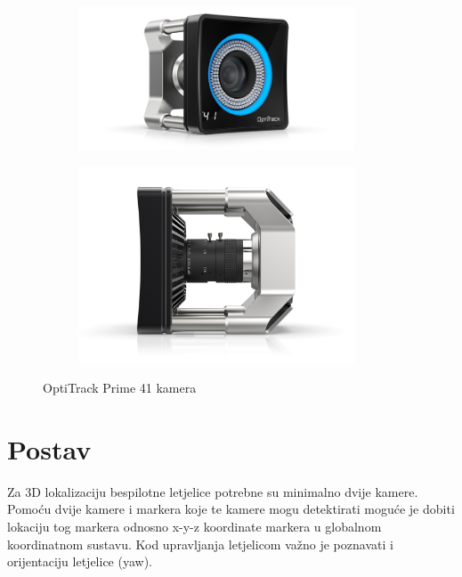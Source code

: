 \documentclass[times, utf8, diplomski]{fer}
\begin{document}
\begin{figure}[h]
\begin{subfigure}[b]{.5\textwidth}
\centering
\includegraphics[width=0.9\textwidth]{prime41}
\caption*{}
\end{subfigure}
\begin{subfigure}[b]{.5\textwidth}
\centering
\includegraphics[width=0.9\textwidth]{prime41-side}
\caption*{}
\end{subfigure}
\caption{OptiTrack Prime 41 kamera \protect\footnotemark[1]}
\end{figure}


\chapter{Postav}
Za 3D lokalizaciju bespilotne letjelice potrebne su minimalno dvije kamere. Pomoću dvije kamere i markera koje te kamere mogu detektirati moguće je dobiti lokaciju tog markera odnosno x-y-z koordinate markera u globalnom koordinatnom sustavu. Kod upravljanja letjelicom važno je poznavati i orijentaciju letjelice (yaw). 
\end{document}
